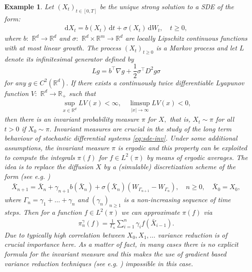 \documentclass[bj]{imsart}
\def\rmd{\mathrm{d}}
\newtheorem{example}[thm]{Example}
\begin{document}
\begin{example}
  Let \((X_t)_{t\in [0,T]}\) be the unique strong solution to a  SDE of the form:
\begin{eqnarray}
\label{eq:sde-inv}
\rmd X_t=b(X_t)\, \rmd t+\sigma(X_t)\, \rmd W_t,\quad t\geq 0,	
\end{eqnarray}
where \(b:\) \(\mathbb{R}^d\to \mathbb{R}^d\) and \(\sigma:\) \(\mathbb{R}^d\times \mathbb{R}^m \to \mathbb{R}^d\) are locally Lipschitz continuous functions with at most linear growth.
The process \((X_t)_{t\geq 0}\) is a Markov
process and let \(L\) denote its infinitesimal generator defined by
\begin{equation*}
Lg=b^\top \nabla g+\frac{1}{2}\sigma^\top D^2g\sigma
\end{equation*}
for any \(g\in C^2(\mathbb{R}^d).\)
If there exists a continuously twice differentiable Lyapunov function \(V:\) \(\mathbb{R}^d\to \mathbb{R}_{+}\) such that
\begin{eqnarray*}
\sup_{x\in \mathbb{R}^d} LV(x) <\infty,\quad \limsup_{|x|\to \infty} LV(x)<0,
\end{eqnarray*}
then there is an invariant probability measure \(\pi\)  for \(X,\) that is, \(X_t\sim \pi\) for all \(t> 0\) if \(X_0\sim \pi.\) Invariant measures are crucial in the study of the long term behaviour of stochastic differential
systems \eqref{eq:sde-inv}.    Under some additional assumptions,  the invariant
measure \(\pi\) is  ergodic and this property
can be exploited  to compute  the integrals \(\pi(f)\) for \(f\in L^2(\pi)\) by means of ergodic averages. The idea is to replace the diffusion \(X\) by a (simulable) discretization scheme of the form (see e.g. \cite{MR3861816})
\begin{eqnarray*}
\bar X_{n+1}=\bar X_n+\gamma_{n+1} b(\bar X_n)+\sigma(\bar X_n)(W_{\Gamma_{n+1}}-W_{\Gamma_n}), \quad n\geq 0,\quad \bar X_0=X_0,
\end{eqnarray*}
where \(\Gamma_n=\gamma_1+\ldots+\gamma_n\) and \((\gamma_n)_{n\geq 1}\) is a non-increasing sequence of time steps. Then for a function \(f\in L^2(\pi)\) we can approximate \(\pi(f)\) via
\begin{eqnarray*}
\pi_n^\gamma(f)=\frac{1}{\Gamma_n}\sum_{i=1}^n \gamma_{i}f(\bar X_{i-1}).
\end{eqnarray*}
Due to typically high correlation between \(X_0,X_1,\ldots\)  variance reduction is of crucial importance here.
As a matter of fact, in many cases there is no explicit formula for the invariant measure and this makes the use of gradient  based  variance reduction techniques (see e.g. \cite{mira2013zero}) impossible in this case.
\end{example}
\end{document}
